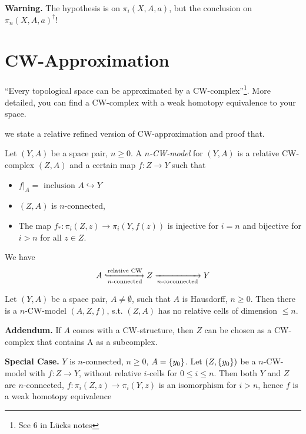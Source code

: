 \documentclass[language=english]{TemplateLecture}
\begin{document}
\textbf{Warning.} The hypothesis is on \(\pi_i(X,A,a)\), but the conclusion on \(\pi_n(X,A,a)^\dagger\)!


\section{CW-Approximation}

\enquote{Every topological space can be approximated by a CW-complex}\footnote{See 6 in Lücks notes}. More detailed, you can find a CW-complex with a weak homotopy equivalence to your space.

we state a relative refined version of CW-approximation and proof that.

\begin{defi}
    Let \((Y,A)\) be a space pair, \(n\geq 0\). A \emph{\(n\)-CW-model} for \((Y,A)\) is a relative CW-complex \((Z,A)\) and a certain map \(f\colon Z\to Y\) such that
    \begin{itemize}
        \item \(f\rvert_{A} = \text{ inclusion } A\hookrightarrow Y\)
        \item \((Z,A)\) is \(n\)-connected,
        \item The map \(f_*\colon \pi_i(Z,z)\to \pi_i(Y,f(z))\) is injective for \(i = n\) and bijective for \(i> n\) for all \(z \in Z\).
    \end{itemize}
\end{defi}

We have
\[A\xhookrightarrow[n\text{-connected}]{\text{relative CW}} Z \xrightarrow[n\text{-coconnected}]{} Y\]

\begin{thm}{}{}
    Let \((Y,A)\) be a space pair, \(A\neq \emptyset\), such that \(A\) is Hausdorff, \(n\geq 0\). Then there is a \(n\)-CW-model \((A,Z,f)\), s.t. \((Z,A)\) has no relative cells of dimension \(\leq n\).
\end{thm}

\textbf{Addendum.} If \(A\) comes with a CW-structure, then \(Z\) can be chosen as a CW-complex that contains A as a subcomplex.

\textbf{Special Case.} \(Y\) is \(n\)-connected, \(n\geq 0\), \(A = \{y_0\}\). Let \((Z,\{y_0\})\) be a \(n\)-CW-model with \(f\colon Z\to Y\), without relative \(i\)-cells for \(0\leq i\leq n\). Then both \(Y\) and \(Z\) are \(n\)-connected, \(f\colon \pi_i(Z,z)\to \pi_i(Y, z)\) is an isomorphism for \(i>n\), hence \(f\) is a weak homotopy equivalence
\end{document}
